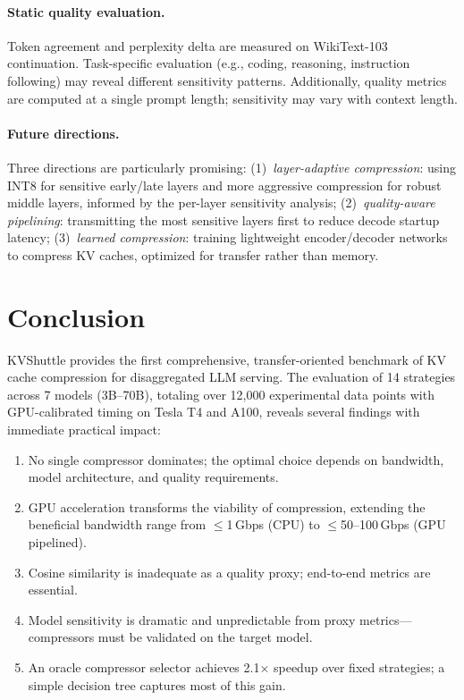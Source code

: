 \documentclass{article}
\begin{document}
\paragraph{Static quality evaluation.} Token agreement and perplexity delta are measured on WikiText-103 continuation. Task-specific evaluation (e.g., coding, reasoning, instruction following) may reveal different sensitivity patterns. Additionally, quality metrics are computed at a single prompt length; sensitivity may vary with context length.

\paragraph{Future directions.} Three directions are particularly promising: (1)~\textit{layer-adaptive compression}: using INT8 for sensitive early/late layers and more aggressive compression for robust middle layers, informed by the per-layer sensitivity analysis; (2)~\textit{quality-aware pipelining}: transmitting the most sensitive layers first to reduce decode startup latency; (3)~\textit{learned compression}: training lightweight encoder/decoder networks to compress KV caches, optimized for transfer rather than memory.

\section{Conclusion}
\label{sec:conclusion}

KVShuttle provides the first comprehensive, transfer-oriented benchmark of KV cache compression for disaggregated LLM serving. The evaluation of 14 strategies across 7 models (3B--70B), totaling over 12{,}000 experimental data points with GPU-calibrated timing on Tesla T4 and A100, reveals several findings with immediate practical impact:

\begin{enumerate}    \item No single compressor dominates; the optimal choice depends on bandwidth, model architecture, and quality requirements.
    \item GPU acceleration transforms the viability of compression, extending the beneficial bandwidth range from $\leq$1\,Gbps (CPU) to $\leq$50--100\,Gbps (GPU pipelined).
    \item Cosine similarity is inadequate as a quality proxy; end-to-end metrics are essential.
    \item Model sensitivity is dramatic and unpredictable from proxy metrics---compressors must be validated on the target model.
    \item An oracle compressor selector achieves 2.1$\times$ speedup over fixed strategies; a simple decision tree captures most of this gain.
\end{enumerate}
\end{document}
